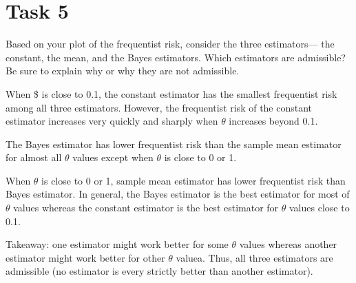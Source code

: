 \documentclass[
]{article}
\begin{document}
\hypertarget{task-5}{%
\section{Task 5}\label{task-5}}

Based on your plot of the frequentist risk, consider the three
estimators--- the constant, the mean, and the Bayes estimators. Which
estimators are admissible? Be sure to explain why or why they are not
admissible.

When \theta\$ is close to 0.1, the constant estimator has the smallest
frequentist risk among all three estimators. However, the frequentist
risk of the constant estimator increases very quickly and sharply when
\(\theta\) increases beyond 0.1.

The Bayes estimator has lower frequentist risk than the sample mean
estimator for almost all \(\theta\) values except when \(\theta\) is
close to 0 or 1.

When \(\theta\) is close to 0 or 1, sample mean estimator has lower
frequentist risk than Bayes estimator. In general, the Bayes estimator
is the best estimator for most of \(\theta\) values whereas the constant
estimator is the best estimator for \(\theta\) values close to 0.1.

Takeaway: one estimator might work better for some \(\theta\) values
whereas another estimator might work better for other \(\theta\) valuea.
Thus, all three estimators are admissible (no estimator is every
strictly better than another estimator).
\end{document}
